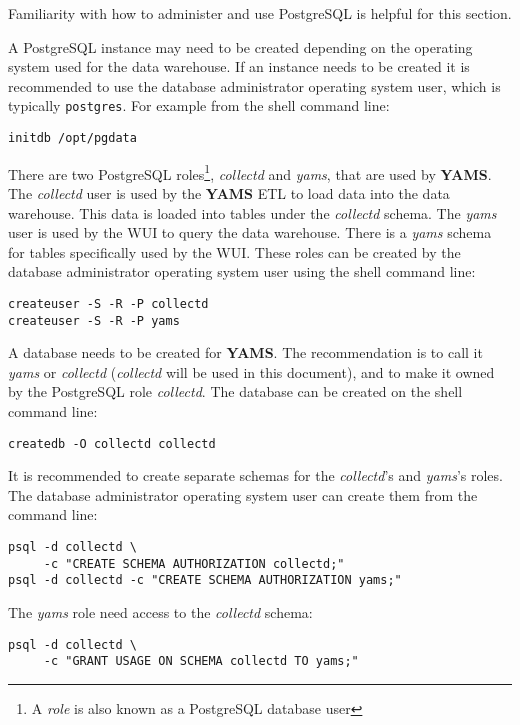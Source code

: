 \documentclass[a4paper,twoside,12pt]{article}
\begin{document}
Familiarity with how to administer and use PostgreSQL is helpful for this
section.

A PostgreSQL instance may need to be created depending on the operating system
used for the data warehouse.  If an instance needs to be created it is
recommended to use the database administrator operating system user, which is
typically \texttt{postgres}.  For example from the shell command line:
\lstset{language=sh}
\begin{lstlisting}
initdb /opt/pgdata
\end{lstlisting}

There are two PostgreSQL roles\footnote{A \textit{role} is also known as a
PostgreSQL database user}, \textit{collectd} and \textit{yams}, that are used
by \textbf{YAMS}.  The \textit{collectd} user is used by the \textbf{YAMS} ETL
to load data into the data warehouse.  This data is loaded into tables under
the \textit{collectd} schema.  The \textit{yams} user is used by the WUI to
query the data warehouse.  There is a \textit{yams} schema for tables
specifically used by the WUI.  These roles can be created by the database
administrator operating system user using the shell command line:
\lstset{language=sh}
\begin{lstlisting}
createuser -S -R -P collectd
createuser -S -R -P yams
\end{lstlisting}

A database needs to be created for \textbf{YAMS}.  The recommendation is to
call it \textit{yams} or \textit{collectd} (\textit{collectd} will be used in
this document), and to make it owned by the PostgreSQL role \textit{collectd}.
The database can be created on the shell command line:
\lstset{language=sh}
\begin{lstlisting}
createdb -O collectd collectd
\end{lstlisting}

It is recommended to create separate schemas for the \textit{collectd}'s and
\textit{yams}'s roles.  The database administrator operating system user can
create them from the command line:
\lstset{language=sh}
\begin{lstlisting}
psql -d collectd \
     -c "CREATE SCHEMA AUTHORIZATION collectd;"
psql -d collectd -c "CREATE SCHEMA AUTHORIZATION yams;"
\end{lstlisting}

The \textit{yams} role need access to the \textit{collectd} schema:
\lstset{language=sh}
\begin{lstlisting}
psql -d collectd \
     -c "GRANT USAGE ON SCHEMA collectd TO yams;"
\end{lstlisting}
\end{document}
